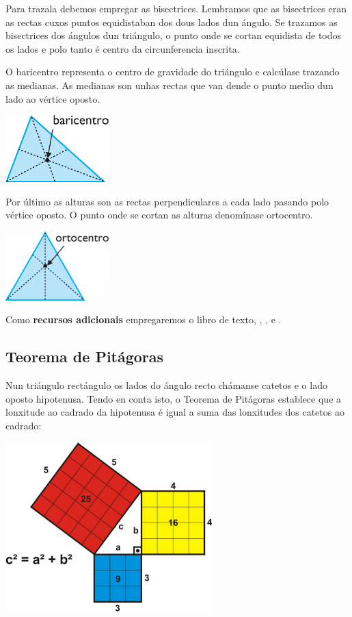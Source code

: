 Para trazala debemos empregar as bisectrices. Lembramos que as bisectrices eran as rectas cuxos puntos equidistaban dos dous lados dun ángulo. Se trazamos as bisectrices dos ángulos dun triángulo, o punto onde se cortan equidista de todos os lados e polo tanto é centro da circunferencia inscrita.

O baricentro representa o centro de gravidade do triángulo e calcúlase trazando as medianas. As medianas son unhas rectas que van dende o punto medio dun lado ao vértice oposto.

\begin{center}
\includegraphics[width=0.3\textwidth]{img/baricentro.png}
\end{center}

Por último as alturas son as rectas perpendiculares a cada lado pasando polo vértice oposto. O punto onde se cortan as alturas denomínase ortocentro.

\begin{center}
\includegraphics[width=0.3\textwidth]{img/ortocentro.png}
\end{center}

Como \textbf{recursos adicionais} empregaremos o libro de texto, \cite{yt:circuncentro}, \cite{yt:incentro}, \cite{yt:baricentro} e \cite{yt:ortocentro}.

\subsection{Teorema de Pitágoras}

Nun triángulo rectángulo os lados do ángulo recto chámanse catetos e o lado oposto hipotenusa. Tendo en conta isto, o Teorema de Pitágoras establece que a lonxitude ao cadrado da hipotenusa é igual a suma das lonxitudes dos catetos ao cadrado:

\begin{center}
\includegraphics[width=0.6\textwidth]{img/pitagoras1.jpg}
\end{center}


